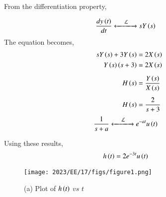 \documentclass[journal,12pt,onecolumn]{IEEEtran}
\theoremstyle{remark}
\begin{document}
	
	
	From the differentiation property,
	
	\begin{align}
		\dfrac{dy\left(t\right)}{dt} &
		\xleftarrow[]{\hspace{0.4cm}{\mathcal{L}}\hspace{0.1cm}}\xrightarrow[]{}
		s Y\left(s\right)
	\end{align}
	The equation becomes,
	\begin{align}
		s Y\left(s\right) + 3 Y\left(s\right) &= 2 X\left(s\right)\\
		Y\left(s\right) \left(s + 3\right) &= 2 X\left(s\right)\\[5pt]
		H\left(s\right) &= \dfrac{Y\left(s\right)}{X\left(s\right)}\\[5pt]
		H\left(s\right) &= \dfrac{2}{s + 3}
	\end{align}
	\begin{align}
		\dfrac{1}{s + a} &
		\xleftarrow[]{\hspace{0.4cm}{\mathcal{L}}\hspace{0.1cm}}\xrightarrow[]{}
		e^{-at} u\left(t\right)
	\end{align}
	
	Using these results,
	\begin{align}
		h\left(t\right) &= 2 e^{-3t} u\left(t\right) 
	\end{align}
	
	
	
	\begin{figure}[htbp]
		\centering
		\texttt{[image: 2023/EE/17/figs/figure1.png]}
		\caption*{(a) Plot of $h\left(t\right)$ $vs$ $t$}
	\end{figure}
	
\end{document}
